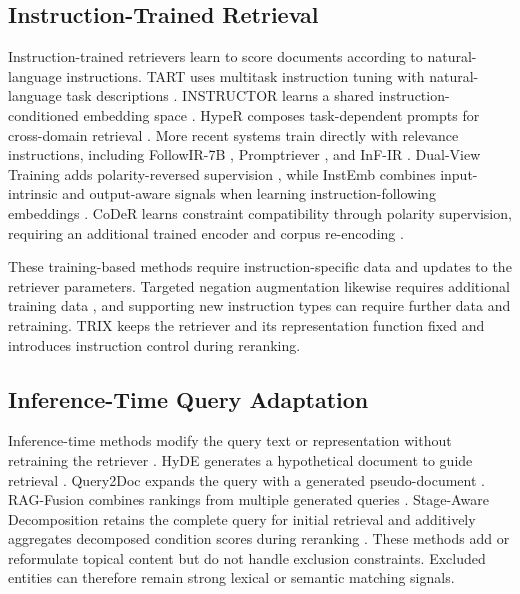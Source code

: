 \documentclass[letterpaper]{article}
\newcommand{\method}{\ifmmode \mathrm{TRIX}\else TRIX\xspace\fi}
\begin{document}
\subsection{Instruction-Trained Retrieval}

Instruction-trained retrievers learn to score documents according to
natural-language instructions.
TART uses multitask instruction tuning with natural-language task descriptions
\cite{DBLP:conf/acl/AsaiSL0I0HY23}.
INSTRUCTOR learns a shared instruction-conditioned embedding space
\cite{DBLP:conf/acl/SuSKWHOYSZ023}.  HypeR composes task-dependent prompts for
cross-domain retrieval \cite{DBLP:conf/iclr/CaiT0XGL0J23}.  More recent systems
train directly with relevance instructions, including FollowIR-7B
\cite{DBLP:conf/naacl/WellerCMLCDLS25}, Promptriever
\cite{DBLP:conf/iclr/WellerDLPZH25},
and InF-IR \cite{zhuang2025infir}.  Dual-View Training adds
polarity-reversed supervision \cite{dualview2026}, while InstEmb combines
input-intrinsic and output-aware signals when learning instruction-following
embeddings \cite{gao2026instemb}.  CoDeR learns constraint compatibility
through polarity supervision, requiring an additional trained encoder and
corpus re-encoding \cite{DBLP:journals/corr/abs-2606-13204}.

These training-based methods require instruction-specific data and updates to
the retriever parameters.  Targeted negation augmentation likewise requires
additional training data \cite{DBLP:conf/emnlp/SinghKS23}, and supporting new
instruction types can require further data and retraining.  \method{} keeps the
retriever and its representation function fixed and introduces instruction
control during reranking.

\subsection{Inference-Time Query Adaptation}

Inference-time methods modify the query text or representation without
retraining the retriever \cite{DBLP:conf/emnlp/MaGHZD23}.
HyDE generates a hypothetical document to guide retrieval
\cite{DBLP:conf/acl/GaoMLC23}.  Query2Doc expands the query with a generated
pseudo-document \cite{DBLP:conf/emnlp/WangYW23}.  RAG-Fusion combines rankings
from multiple generated queries \cite{raudaschl2024ragfusion}.  Stage-Aware
Decomposition retains the complete query for initial retrieval and additively
aggregates decomposed condition scores during reranking
\cite{yin2026stageaware}.  These methods add or reformulate topical content but
do not handle exclusion constraints.  Excluded entities can therefore remain
strong lexical or semantic matching signals.
\end{document}
